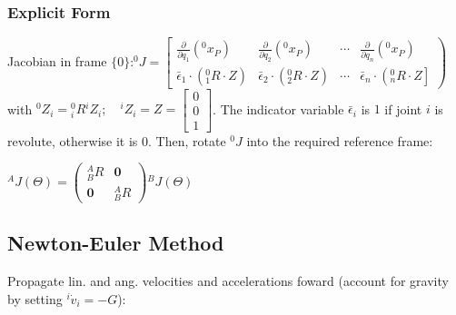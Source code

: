 \subsubsection{Explicit Form}

Jacobian in frame $\{0\}$:\quad\quad\quad\quad\quad ${ }^{0} J=\left[\begin{array}{cccc}
\frac{\partial}{\partial q_{1}}\left({ }^{0} x_{P}\right) & \frac{\partial}{\partial q_{2}}\left({ }^{0} x_{P}\right) & \cdots & \frac{\partial}{\partial q_{n}}\left({ }^{0} x_{P}\right) \\
\bar\epsilon_{1} \cdot\left({ }_{1}^{0} R \cdot Z\right) & \bar\epsilon_{2} \cdot\left({ }_{2}^{0} R \cdot Z\right) & \cdots & \bar\epsilon_{n} \cdot\left({ }_{n}^{0} R \cdot Z\right]
\end{array}\right)$\\
with ${ }^{0} Z_{i}={ }_{i}^{0} R{ }^{i} Z_{i} ; \quad{ }^{i} Z_{i}=Z=\left[\begin{array}{l}0 \\0 \\1\end{array}\right]$. The indicator variable $\bar\epsilon_{i}$ is $1$ if joint $i$ is revolute, otherwise it is $0$. Then, rotate ${}^0J$ into the required reference frame:

\begin{center}
	${}^A J (\Theta ) = \begin{pmatrix} {}^A_B R & \mathbf{0} \\ \mathbf{0} & {}^A_B R \end{pmatrix} {}^B J (\Theta)$
\end{center}

\subsection{Newton-Euler Method}

Propagate lin. and ang. velocities and accelerations foward (account for gravity by setting ${ }^{i} \dot{v}_{i}=-G$):

